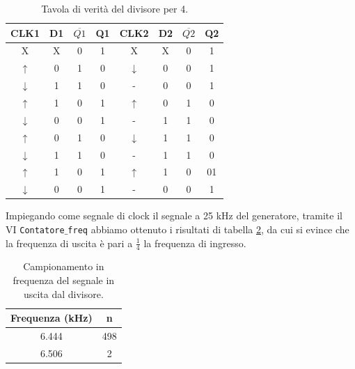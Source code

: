 \documentclass[journal, a4paper]{IEEEtran}
\begin{document}
\begin{table}[htp]
\centering
\caption{Tavola di verità del divisore per 4.}
\label{tab:4}
\begin{tabular}{|c|c|c|c|c|c|c|c|}
\hline 
CLK1 & D1 & $\overline{Q1}$ & Q1 & CLK2 & D2 & $\overline{Q2}$ & Q2 \\ 
\hline 
X & X & 0 & 1 & X & X & 0 & 1 \\ 
\hline 
$\uparrow$ & 0 & 1 & 0 & $\downarrow$ & 0 & 0 & 1 \\ 
\hline 
$\downarrow$ & 1 & 1 & 0 & - & 0 & 0 & 1 \\ 
\hline 
$\uparrow$ & 1 & 0 & 1 & $\uparrow$ & 0 & 1 & 0 \\ 
\hline 
$\downarrow$ & 0& 0 & 1 & - & 1 & 1 & 0 \\ 
\hline 
$\uparrow$ & 0 & 1 & 0 & $\downarrow$ & 1 & 1 & 0 \\ 
\hline 
$\downarrow$ & 1 & 1 & 0 & - & 1 & 1 & 0 \\ 
\hline 
$\uparrow$ & 1 & 0 & 1 & $\uparrow$ & 1 & 0 & 01\\ 
\hline 
$\downarrow$ & 0 & 0 & 1 & - & 0 & 0 & 1 \\ 
\hline
\end{tabular} 
\end{table}

Impiegando come segnale di clock il segnale a 25 kHz del generatore, tramite il VI \texttt{Contatore$\_$freq} abbiamo ottenuto i risultati di tabella \ref{tab:div4}, da cui si evince che la frequenza di uscita è pari a $\frac{1}{4}$ la frequenza di ingresso.

\begin{table}[htp]
\centering
\caption{Campionamento in frequenza del segnale in uscita dal divisore.}
\label{tab:div4}
\begin{tabular}{|c|c|}
\hline 
Frequenza (kHz) & n \\ 
\hline 
6.444 & 498 \\ 
\hline 
6.506 & 2 \\ 
\hline 
\end{tabular} 
\end{table}
\end{document}
